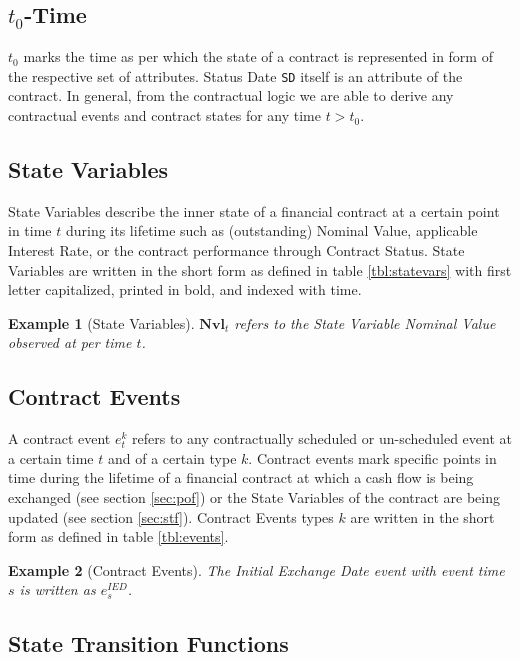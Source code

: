 \documentclass[9pt,oneside]{amsart}
\newtheorem{example}{Example}
\newcommand{\svar}[2]{\textbf{#1}_{#2}}
\newcommand{\attr}[1]{\texttt{#1}}
\begin{document}
\begin{multicols}{2}
\subsection{$t_0$-Time}

$t_0$ marks the time as per which the state of a contract is represented in form of the respective set of attributes. Status Date \attr{SD} itself is an attribute of the contract. In general, from the contractual logic we are able to derive any contractual events and contract states for any time $t>t_0$.


\subsection{State Variables}

State Variables describe the inner state of a financial contract at a certain point in time $t$ during its lifetime such as (outstanding) Nominal Value, applicable Interest Rate, or the contract performance through Contract Status. State Variables are written in the short form as defined in table \ref{tbl:statevars} with first letter capitalized, printed in bold, and indexed with time.

\begin{example}[State Variables]
$\svar{Nvl}{t}$ refers to the State Variable \textit{Nominal Value} observed at per time $t$.
\end{example}


\subsection{Contract Events}

A contract event $e_t^k$ refers to any contractually scheduled or un-scheduled event at a certain time $t$ and of a certain type $k$. Contract events mark specific points in time during the lifetime of a financial contract at which a cash flow is being exchanged (see section \ref{sec:pof}) or the State Variables of the contract are being updated (see section \ref{sec:stf}). Contract Events types $k$ are written in the short form as defined in table \ref{tbl:events}.

\begin{example}[Contract Events]
The \textit{Initial Exchange Date} event with event time $s$ is written as $e_s^{IED}$.
\end{example}


\subsection{State Transition Functions}


\end{multicols}
\end{document}
